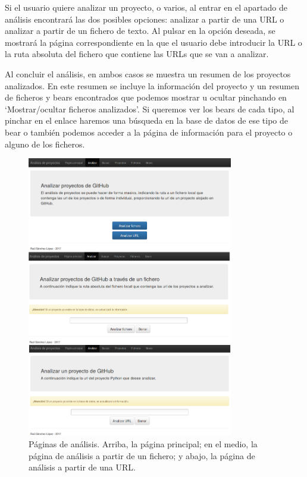 \documentclass[a4paper, 12pt]{book}
\begin{document}
Si el usuario quiere analizar un proyecto, o varios, al entrar en el apartado de análisis encontrará las dos posibles opciones: analizar a partir de una URL o analizar a partir de un fichero de texto. Al pulsar en la opción deseada, se mostrará la página correspondiente en la que el usuario debe introducir la URL o la ruta absoluta del fichero que contiene las URLs que se van a analizar.

Al concluir el análisis, en ambos casos se muestra un resumen de los proyectos analizados. En este resumen se incluye la información del proyecto y un resumen de ficheros y bears encontrados que podemos mostrar u ocultar pinchando en `Mostrar/ocultar ficheros analizados'. Si queremos ver los bears de cada tipo, al pinchar en el enlace haremos una búsqueda en la base de datos de ese tipo de bear o también podemos acceder a la página de información para el proyecto o alguno de los ficheros.

\begin{figure}[H]
  \centering
  \includegraphics[width=9cm, keepaspectratio]{img/webAnalisis}
  \caption{Páginas de análisis. Arriba, la página principal; en el medio, la página de análisis a partir de un fichero; y abajo, la página de análisis a partir de una URL.}
  \label{fig:webAnalisis}
\end{figure}
\end{document}
